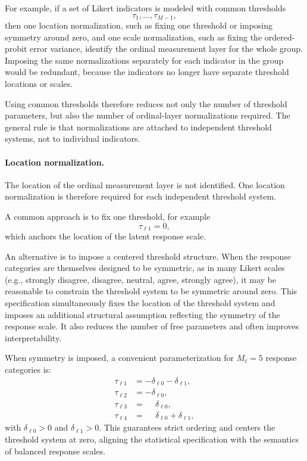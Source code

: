 \documentclass[12pt,a4paper]{article}
\begin{document}
For example, if a set of Likert indicators is modeled with common
thresholds
\[
  \tau_1,\ldots,\tau_{M-1},
\]
then one location normalization, such as fixing one threshold or
imposing symmetry around zero, and one scale normalization, such as
fixing the ordered-probit error variance, identify the ordinal
measurement layer for the whole group. Imposing the same
normalizations separately for each indicator in the group would be
redundant, because the indicators no longer have separate threshold
locations or scales.

Using common thresholds therefore reduces not only the number of
threshold parameters, but also the number of ordinal-layer
normalizations required. The general rule is that normalizations are
attached to independent threshold systems, not to individual
indicators.

\paragraph{Location normalization.}
The location of the ordinal measurement layer is not identified. One
location normalization is therefore required for each independent
threshold system.

A common approach is to fix one threshold, for example
\[
\tau_{\ell 1}=0,
\]
which anchors the location of the latent response scale.

An alternative is to impose a centered threshold structure. When the
response categories are themselves designed to be symmetric, as in
many Likert scales (e.g., strongly disagree, disagree, neutral,
agree, strongly agree), it may be reasonable to constrain the
threshold system to be symmetric around zero. This specification
simultaneously fixes the location of the threshold system and imposes
an additional structural assumption reflecting the symmetry of the
response scale. It also reduces the number of free parameters and
often improves interpretability.

When symmetry is imposed, a convenient parameterization for $M_\ell=5$
response categories is:
\[
\begin{aligned}
  \tau_{\ell 1} &= -\delta_{\ell 0} - \delta_{\ell 1}, \\ \tau_{\ell
    2} &= -\delta_{\ell 0}, \\ \tau_{\ell 3} &=
  \phantom{-}\delta_{\ell 0}, \\ \tau_{\ell 4} &=
  \phantom{-}\delta_{\ell 0} + \delta_{\ell 1},
\end{aligned}
\]
with $\delta_{\ell 0}>0$ and $\delta_{\ell 1}>0$. This guarantees
strict ordering and centers the threshold system at zero, aligning the
statistical specification with the semantics of balanced response
scales.
\end{document}
